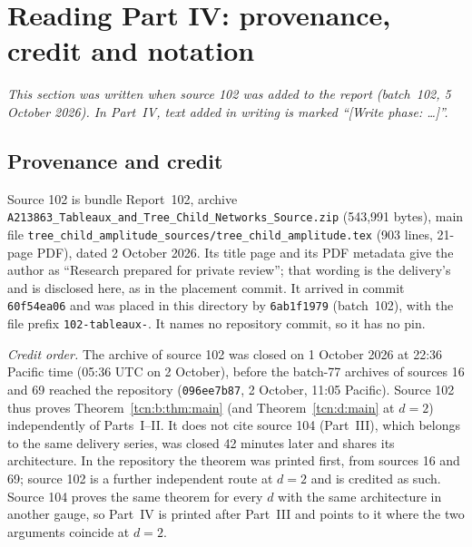 \documentclass[11pt,letterpaper]{article}
\theoremstyle{remark}
\begin{document}
\section{Reading Part IV: provenance, credit and notation}\label{tcn:w:sec:reading}
\emph{This section was written when source 102 was added to the report (batch~102, 5 October 2026). In Part~IV, text added in writing is marked ``[Write phase: \dots]''.}

\subsection{Provenance and credit}\label{tcn:w:sec:provenance}
Source 102 is bundle Report~102, archive \textup{\nolinkurl{A213863_Tableaux_and_Tree_Child_Networks_Source.zip}} (543,991 bytes), main file \textup{\nolinkurl{tree_child_amplitude_sources/tree_child_amplitude.tex}} (903 lines, 21-page PDF), dated 2 October 2026. Its title page and its PDF metadata give the author as ``Research prepared for private review''; that wording is the delivery's and is disclosed here, as in the placement commit. It arrived in commit \texttt{60f54ea06} and was placed in this directory by \texttt{6ab1f1979} (batch~102), with the file prefix \textup{\nolinkurl{102-tableaux-}}. It names no repository commit, so it has no pin.

\emph{Credit order.} The archive of source 102 was closed on 1 October 2026 at 22:36 Pacific time (05:36 UTC on 2 October), before the batch-77 archives of sources 16 and 69 reached the repository (\texttt{096ee7b87}, 2 October, 11:05 Pacific). Source 102 thus proves Theorem~\ref{tcn:b:thm:main} (and Theorem~\ref{tcn:d:main} at $d=2$) independently of Parts~I--II. It does not cite source 104 (Part~III), which belongs to the same delivery series, was closed 42 minutes later and shares its architecture. In the repository the theorem was printed first, from sources 16 and 69; source 102 is a further independent route at $d=2$ and is credited as such. Source 104 proves the same theorem for every $d$ with the same architecture in another gauge, so Part~IV is printed after Part~III and points to it where the two arguments coincide at $d=2$.
\end{document}
